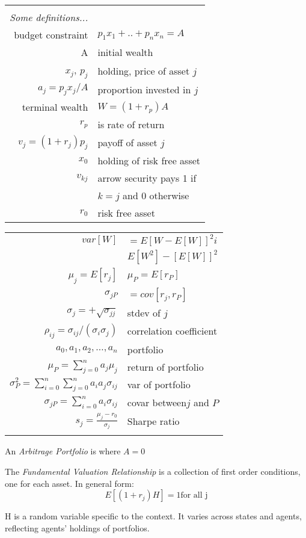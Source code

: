 \begin{tabular}{rl}
&\\
\emph{Some definitions...}&\\
budget constraint& $p_1x_1+..+p_nx_n=A$\\
A &initial wealth\\
$x_j$, $p_j$&holding, price of asset $j$\\
$a_j=p_jx_j/A$& proportion invested in $j$\\
terminal wealth& $W = (1 + r_p)A$\\
$r_p$& is rate of return  \\
$v_j=(1+r_j)p_j$ & payoff of asset $j$\\
$x_0$&holding of risk free asset\\
$v_{kj}$& arrow security pays 1 if\\
&$k=j$ and 0 otherwise\\
$r_0$&risk free asset\\
\end{tabular}
\begin{tabular}{rl}
$var[W]$&$=E[W-E[W]]^2i$\\
        &$E[W^2]-[E[W]]^2$\\
$\mu_j=E[r_j]$&$\mu_P=E[r_P]$\\
$\sigma_{jP}$&$=cov[r_j,r_P]$\\
$\sigma_j=+\sqrt{\sigma_{jj}}$&stdev of $j$\\
$\rho_{ij}=\sigma_{ij}/(\sigma_i\sigma_j)$& correlation coefficient\\
$a_0,a_1,a_2,\ldots,a_n$&portfolio\\
$\mu_P=\sum^n_{j=0}a_j\mu_j$&return of portfolio\\
$\sigma^2_P=\sum^n_{i=0}\sum^n_{j=0}a_ia_j\sigma_{ij}$&var of portfolio\\
$\sigma_{jP}=\sum^n_{i=0}a_i\sigma_{ij}$&covar between$j$ and $P$\\
$s_j=\frac{\mu_j-r_0}{\sigma_j}$& Sharpe ratio\\
&\\
\end{tabular}

An \emph{Arbitrage Portfolio} is where $A = 0$

The \emph{Fundamental Valuation Relationship} is a collection of first order
conditions, one for each asset. In general form: \[E[(1+r_j)H]=1 \mbox{for all
j}\]

H is a random variable specific to the context. It varies across states and
agents, reflecting agents' holdings of portfolios.



